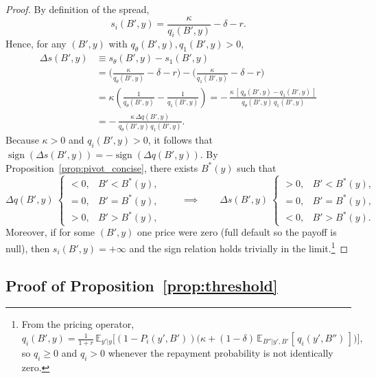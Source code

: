 \documentclass[12pt]{article}
\theoremstyle{plain}
\newcommand{\E}{\mathbb{E}}
\begin{document}
\begin{proof}
	By definition of the spread,
	\[
		s_i(B',y)=\frac{\kappa}{q_i(B',y)}-\delta-r.
	\]
	Hence, for any \((B',y)\) with \(q_\theta(B',y),q_1(B',y)>0\),
	\begin{align}
		\Delta s(B',y)
		 & \equiv s_\theta(B',y)-s_1(B',y) \nonumber                                                                                            \\
		 & =\Big(\tfrac{\kappa}{q_\theta(B',y)}-\delta-r\Big)-\Big(\tfrac{\kappa}{q_1(B',y)}-\delta-r\Big) \label{eq:spread_difference_compact} \\
		 & =\kappa\!\left(\tfrac{1}{q_\theta(B',y)}-\tfrac{1}{q_1(B',y)}\right)
		= -\,\frac{\kappa\,[\,q_\theta(B',y)-q_1(B',y)\,]}{q_\theta(B',y)\,q_1(B',y)} \nonumber                                                 \\
		 & = -\,\frac{\kappa\,\Delta q(B',y)}{q_\theta(B',y)\,q_1(B',y)}. \label{eq:spread_price_relationship_compact}
	\end{align}
	Because \(\kappa>0\) and \(q_i(B',y)>0\), it follows that
	\(\operatorname{sign}(\Delta s(B',y))=-\operatorname{sign}(\Delta q(B',y))\).
	By Proposition~\ref{prop:pivot_concise}, there exists \(B^*(y)\) such that
	\[
		\Delta q(B',y)\ \begin{cases}
			< 0, & B' < B^*(y), \\
			= 0, & B' = B^*(y), \\
			> 0, & B' > B^*(y),
		\end{cases}
		\qquad\implies\qquad
		\Delta s(B',y)\ \begin{cases}
			> 0, & B' < B^*(y), \\
			= 0, & B' = B^*(y), \\
			< 0, & B' > B^*(y).
		\end{cases}
	\]
	Moreover, if for some \((B',y)\) one price were zero (full default so the
	payoff is null), then \(s_i(B',y)=+\infty\) and the sign relation holds
	trivially in the limit.\footnote{From the pricing operator, \(
		q_i(B',y)=\frac{1}{1+r}\,\E_{y'|y}\!\big[(1-P_i(y',B'))\big(\kappa+(1-\delta)\,\E_{B''|y',B'}[\,q_i(y',B'')\,]\big)\big],
		\) so \(q_i\ge 0\) and \(q_i>0\) whenever the repayment probability is not
		identically zero.}
\end{proof}

\subsection{Proof of Proposition~\ref{prop:threshold}}\label{app:proof_threshold}
\end{document}
